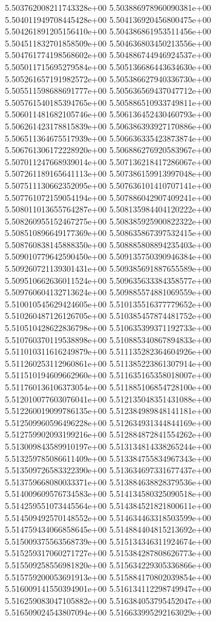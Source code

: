5.503762008211743328e+00
5.503886978960090381e+00
5.504011949708445428e+00
5.504136920456800475e+00
5.504261891205156410e+00
5.504386861953511456e+00
5.504511832701858509e+00
5.504636803450213556e+00
5.504761774198568602e+00
5.504886744946924537e+00
5.505011715695279584e+00
5.505136686443634630e+00
5.505261657191982572e+00
5.505386627940336730e+00
5.505511598688691777e+00
5.505636569437047712e+00
5.505761540185394765e+00
5.505886510933749811e+00
5.506011481682105746e+00
5.506136452430460793e+00
5.506261423178815839e+00
5.506386393927170886e+00
5.506511364675517939e+00
5.506636335423873874e+00
5.506761306172228920e+00
5.506886276920583967e+00
5.507011247668939014e+00
5.507136218417286067e+00
5.507261189165641113e+00
5.507386159913997048e+00
5.507511130662352095e+00
5.507636101410707141e+00
5.507761072159054194e+00
5.507886042907409241e+00
5.508011013655764287e+00
5.508135984404120222e+00
5.508260955152467275e+00
5.508385925900822322e+00
5.508510896649177369e+00
5.508635867397532415e+00
5.508760838145888350e+00
5.508885808894235403e+00
5.509010779642590450e+00
5.509135750390946384e+00
5.509260721139301431e+00
5.509385691887655589e+00
5.509510662636011524e+00
5.509635633384358577e+00
5.509760604132713624e+00
5.509885574881069559e+00
5.510010545629424605e+00
5.510135516377779652e+00
5.510260487126126705e+00
5.510385457874481752e+00
5.510510428622836798e+00
5.510635399371192733e+00
5.510760370119538898e+00
5.510885340867894833e+00
5.511010311616249879e+00
5.511135282364604926e+00
5.511260253112960861e+00
5.511385223861307914e+00
5.511510194609662960e+00
5.511635165358018007e+00
5.511760136106373054e+00
5.511885106854728100e+00
5.512010077603076041e+00
5.512135048351431088e+00
5.512260019099786135e+00
5.512384989848141181e+00
5.512509960596496228e+00
5.512634931344844169e+00
5.512759902093199216e+00
5.512884872841554262e+00
5.513009843589910197e+00
5.513134814338265244e+00
5.513259785086611409e+00
5.513384755834967343e+00
5.513509726583322390e+00
5.513634697331677437e+00
5.513759668080033371e+00
5.513884638828379536e+00
5.514009609576734583e+00
5.514134580325090518e+00
5.514259551073445564e+00
5.514384521821800611e+00
5.514509492570148552e+00
5.514634463318503599e+00
5.514759434066858645e+00
5.514884404815213692e+00
5.515009375563568739e+00
5.515134346311924674e+00
5.515259317060271727e+00
5.515384287808626773e+00
5.515509258556981820e+00
5.515634229305336866e+00
5.515759200053691913e+00
5.515884170802039854e+00
5.516009141550394901e+00
5.516134112298749947e+00
5.516259083047105882e+00
5.516384053795452047e+00
5.516509024543807094e+00
5.516633995292163029e+00
